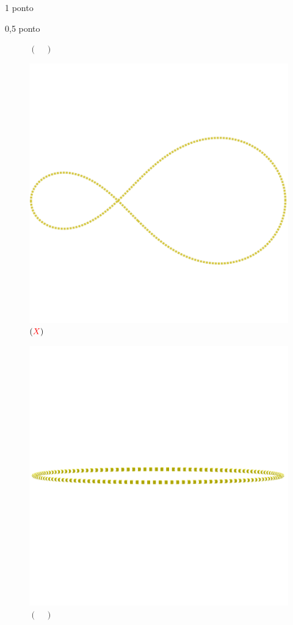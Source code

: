 \documentclass{../lista}
\begin{document}
\begin{questao}{1 ponto}
\begin{pergunta}{0,5 ponto}
\begin{multicols}{2}
\begin{figure}[H]
					\captionsetup{labelformat=empty}
					\caption{$(\quad)$}
				\end{figure}
				\begin{figure}[H]
					\centering
					\includegraphics[scale=0.15]{./img/5c}
					\captionsetup{labelformat=empty}
					\caption{$(\textcolor{red}{X})$}
				\end{figure}
				\begin{figure}[H]
					\centering
					\includegraphics[scale=0.15]{./img/5d}
					\captionsetup{labelformat=empty}
					\caption{$(\quad)$}
				\end{figure}
			\end{multicols}
		\end{pergunta}


\end{questao}
\end{document}
